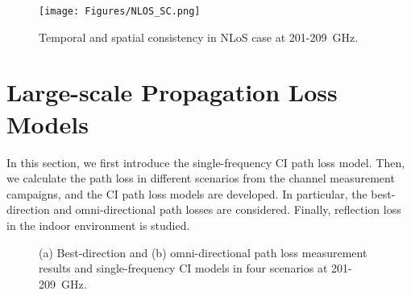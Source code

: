 \documentclass[journal,12pt,draftclsnofoot,onecolumn]{IEEEtran}
\begin{document}
\begin{figure}
\centering
\texttt{[image: Figures/NLOS\_SC.png]}
\caption{Temporal and spatial consistency in NLoS case at 201-209~GHz.}
\label{fig:sc_nlos}
\end{figure}



\section{Large-scale Propagation Loss Models}  \label{Sec:PathLossCharacterizationsandModels}
In this section, we first introduce the single-frequency CI path loss model. Then, we calculate the path loss in different scenarios from the channel measurement campaigns, and the CI path loss models are developed. In particular, the best-direction and omni-directional path losses are considered. Finally, reflection loss in the indoor environment is studied. 

\begin{figure*}[htbp]
\centering
{}
\caption{(a) Best-direction and (b) omni-directional path loss measurement results and single-frequency CI models in four scenarios at 201-209~GHz.}
\label{fig:pl} 
\end{figure*}
\end{document}
